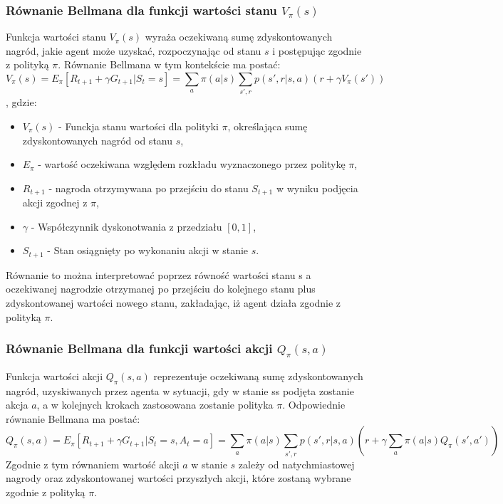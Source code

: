 \documentclass[a4paper, 12pt]{article}
\begin{document}
    \subsubsection{Równanie Bellmana dla funkcji wartości stanu \( V_\pi(s) \)}
    Funkcja wartości stanu \( V_\pi(s) \) wyraża oczekiwaną sumę zdyskontowanych nagród, jakie agent może uzyskać, rozpoczynając od stanu \( s \) i postępując zgodnie z polityką \( \pi \). 
    Równanie Bellmana w tym kontekście ma postać:
    \[ V_\pi(s) = E_\pi[R_{t+1} + \gamma G_{t+1}|S_t = s] = \sum_{a} \pi(a|s) \sum_{s',r} p(s',r|s,a) (r + \gamma V_\pi(s')) \],
    gdzie:
    \begin{itemize}
        \item \( V_\pi(s) \) - Funckja stanu wartości dla polityki \( \pi \), określająca sumę zdyskontowanych nagród od stanu \( s \),
        \item \( E_\pi \) - wartość oczekiwana względem rozkładu wyznaczonego przez politykę \( \pi \),
        \item \( R_{t+1} \) - nagroda otrzymywana po przejściu do stanu \( S_{t+1} \) w wyniku podjęcia akcji zgodnej z \( \pi \), 
        \item \( \gamma \) - Współczynnik dyskonotwania z przedziału \( [0,1] \),
        \item \( S_{t+1} \) - Stan osiągnięty po wykonaniu akcji w stanie \( s \).
    \end{itemize}
    Równanie to można interpretować poprzez równość wartości stanu s a oczekiwanej nagrodzie otrzymanej po przejściu do kolejnego stanu plus zdyskontowanej wartości nowego stanu,
    zakładając, iż agent działa zgodnie z polityką \( \pi \).
    \subsubsection{Równanie Bellmana dla funkcji wartości akcji \( Q_\pi(s,a) \)}
    Funkcja wartości akcji \( Q_\pi(s,a) \) reprezentuje oczekiwaną sumę zdyskontowanych nagród, uzyskiwanych przez agenta w sytuacji, gdy w stanie ss podjęta zostanie akcja \( a \), a w kolejnych krokach zastosowana zostanie polityka \( \pi \). Odpowiednie równanie Bellmana ma postać:
    \[ Q_\pi(s,a) = E_\pi[R_{t+1} + \gamma G_{t+1}|S_t = s, A_t = a] = \sum_{a} \pi(a|s) \sum_{s',r} p(s',r|s,a)(r + \gamma \sum_{a} \pi(a|s)Q_\pi(s',a')) \]
    Zgodnie z tym równaniem wartość akcji \( a \) w stanie \( s \) zależy od natychmiastowej nagrody oraz zdyskontowanej wartości przyszłych akcji, które zostaną wybrane zgodnie z polityką \( \pi \).
\end{document}
